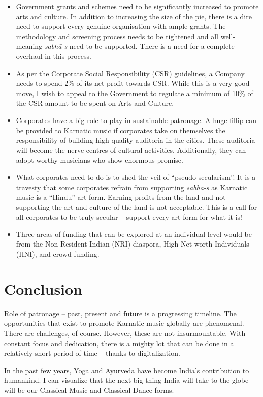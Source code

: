 \begin{itemize}
 \item Government grants and schemes need to be significantly increased to promote arts and culture. In addition to increasing the size of the pie, there is a dire need to support every genuine organisation with ample grants. The methodology and screening process needs to be tightened and all well-meaning \textit{sabhā-s} need to be supported. There is a need for a complete overhaul in this process.

 \item As per the Corporate Social Responsibility (CSR) guidelines, a Company needs to spend 2\% of its net profit towards CSR. While this is a very good move, I wish to appeal to the Government to regulate a minimum of 10\% of the CSR amount to be spent on Arts and Culture.

 \item Corporates have a big role to play in sustainable patronage. A huge fillip can be provided to Karnatic music if corporates take on themselves the responsibility of building high quality auditoria in the cities. These auditoria will become the nerve centres of cultural activities. Additionally, they can adopt worthy musicians who show enormous promise.

 \item What corporates need to do is to shed the veil of “pseudo-secularism”. It is a travesty that some corporates refrain from supporting \textit{sabhā-s} as Karnatic music is a “Hindu” art form. Earning profits from the land and not supporting the art and culture of the land is not acceptable. This is a call for all corporates to be truly secular – support every art form for what it is!

 \item Three areas of funding that can be explored at an individual level would be from the Non-Resident Indian (NRI) diaspora, High Net-worth Individuals (HNI), and crowd-funding.

\end{itemize}

\vspace{-.5cm}

\section*{Conclusion}

Role of patronage – past, present and future is a progressing timeline. The opportunities that exist to promote Karnatic music globally are phenomenal. There are challenges, of course. However, these are not insurmountable. With constant focus and dedication, there is a mighty lot that can be done in a relatively short period of time – thanks to digitalization.

In the past few years, Yoga and Āyurveda have become India’s contribution to humankind. I can visualize that the next big thing India will take to the globe will be our Classical Music and Classical Dance forms.

\theendnotes

